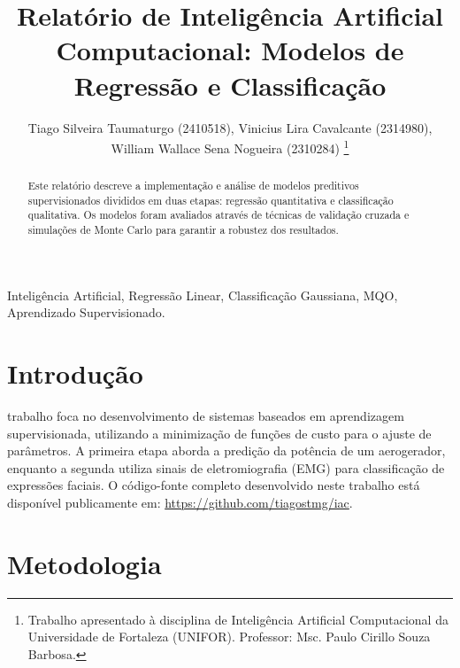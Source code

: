 \documentclass[journal,onecolumn]{IEEEtran}
\begin{document}
\title{Relatório de Inteligência Artificial Computacional: Modelos de Regressão e Classificação}

\author{Tiago Silveira Taumaturgo (2410518), 
        Vinicius Lira Cavalcante (2314980), \\
        William Wallace Sena Nogueira (2310284)
\thanks{Trabalho apresentado à disciplina de Inteligência Artificial Computacional da Universidade de Fortaleza (UNIFOR). Professor: Msc. Paulo Cirillo Souza Barbosa.}}

\maketitle

\begin{abstract}
Este relatório descreve a implementação e análise de modelos preditivos supervisionados divididos em duas etapas: regressão quantitativa e classificação qualitativa. Os modelos foram avaliados através de técnicas de validação cruzada e simulações de Monte Carlo para garantir a robustez dos resultados.
\end{abstract}

\begin{IEEEkeywords}
Inteligência Artificial, Regressão Linear, Classificação Gaussiana, MQO, Aprendizado Supervisionado.
\end{IEEEkeywords}

\section{Introdução}
 trabalho foca no desenvolvimento de sistemas baseados em aprendizagem supervisionada, utilizando a minimização de funções de custo para o ajuste de parâmetros. A primeira etapa aborda a predição da potência de um aerogerador, enquanto a segunda utiliza sinais de eletromiografia (EMG) para classificação de expressões faciais. O código-fonte completo desenvolvido neste trabalho está disponível publicamente em: \href{https://github.com/tiagostmg/iac}{https://github.com/tiagostmg/iac}.

\section{Metodologia}
\end{document}

